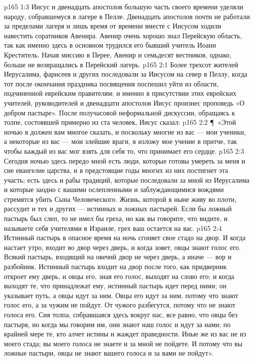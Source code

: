 \vs p165 1:3 Иисус и двенадцать апостолов большую часть своего времени уделяли народу, собравшемуся в лагере в Пелле. Двенадцать апостолов почти не работали за пределами лагеря и лишь время от времени вместе с Иисусом ходили навестить соратников Авенира. Авенир очень хорошо знал Перейскую область, так как именно здесь в основном трудился его бывший учитель Иоанн Креститель. Начав миссию в Перее, Авенир и семьдесят вестников, однако, больше не возвращались в Перейский лагерь.
\vs p165 2:1 Более трехсот жителей Иерусалима, фарисеев и других последовали за Иисусом на север в Пеллу, когда тот после окончания праздника посвящения поспешил уйти из области, подчиненной еврейским правителям; и именно в присутствии этих еврейских учителей, руководителей и двенадцати апостолов Иисус произнес проповедь «О добром пастыре». После получасовой неформальной дискуссии, обращаясь к толпе, состоявшей примерно из ста человек, Иисус сказал:
\vs p165 2:2 \P\ «Этой ночью я должен вам многое сказать, и поскольку многие из вас --- мои ученики, а некоторые из вас --- мои злейшие враги, я изложу мое учение в притче, так чтобы каждый из вас мог взять для себя то, что принимает его сердце.
\vs p165 2:3 Сегодня ночью здесь передо мной есть люди, которые готовы умереть за меня и сие евангелие царства, и в предстоящие годы многих из них постигнет эта участь; есть здесь и рабы традиций, которые последовали за мной из Иерусалима и которые заодно с вашими ослепленными и заблуждающимися вождями стремятся убить Сына Человеческого. Жизнь, которой я ныне живу во плоти, рассудит и тех и других --- истинных и ложных пастырей. Если бы ложный пастырь был слеп, то не имел бы греха, но как вы говорите, что видите, и называете себя учителями в Израиле, грех ваш остается на вас.
\vs p165 2:4 Истинный пастырь в опасное время на ночь сгоняет свое стадо на двор. И когда настает утро, входит во двор через дверь, и когда зовет, овцы знают голос его. Всякий пастырь, входящий на овечий двор не через дверь, а иначе --- вор и разбойник. Истинный пастырь входит на двор после того, как придверник откроет ему дверь, и овцы его, зная его голос, выходят на слово его; и когда выходят те, что принадлежат ему, истинный пастырь идет перед ними; он указывает путь, а овцы идут за ним. Овцы его идут за ним, потому что знают голос его, а за чужим не пойдут. От чужого разбегутся, потому что не знают голоса его. Сия толпа, собравшаяся здесь вокруг нас, все равно, что овцы без пастыря, но когда мы говорим им, они знают наш голос и идут за нами; по крайней мере те, кто алчет истины и жаждет праведности. Иные же из вас не из моего стада; вы моего голоса не знаете и за мной не пойдете. И потому что вы ложные пастыри, овцы не знают вашего голоса и за вами не пойдут».

